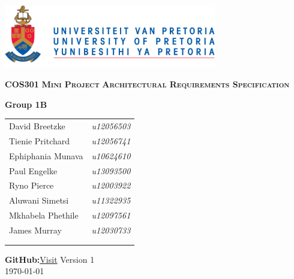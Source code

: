 \begin{titlepage}
\begin{center}
\includegraphics[width=350px]{University_of_Pretoria_Logo.png}
\newline
\newline


\begin{flushright} \large
\textbf {\textsc{\LARGE COS301}}\newline
\textbf {\textsc{\LARGE Mini Project}}\newline
\textbf {\textsc{\LARGE Architectural Requirements Specification}}\newline
\end{flushright}



\textbf{Group 1B} \\

\vspace{0.5 cm}
\begin{tabular}{lr}
David Breetzke&\emph{u12056503} \\
Tienie Pritchard&\emph{u12056741} \\
Ephiphania Munava&\emph{u10624610} \\
Paul Engelke&\emph{u13093500} \\
Ryno Pierce&\emph{u12003922} \\
Aluwani Simetsi&\emph{u11322935} \\
Mkhabela Phethile&\emph{u12097561} \\
James Murray&\emph{u12030733} \\ 
\\
\\

\end{tabular}

\vspace{1cm}
\textbf{GitHub:}\href{https://github.com/davidbreetzke/COS_301_Phase2_1B}{Visit}
\vfill
{\large Version 1}
\\
{\large \today}

\end{center}
\end{titlepage}
